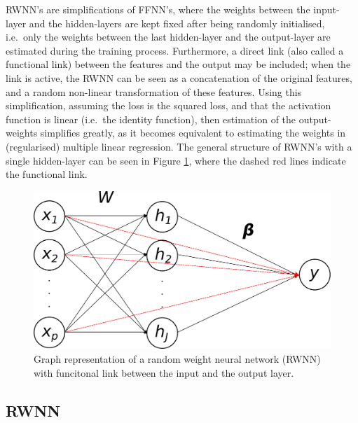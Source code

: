 \documentclass[
]{jss}
\begin{document}
RWNN's are simplifications of FFNN's, where the weights between the
input-layer and the hidden-layers are kept fixed after being randomly
initialised, i.e.~only the weights between the last hidden-layer and the
output-layer are estimated during the training process. Furthermore, a
direct link (also called a functional link) between the features and the
output may be included; when the link is active, the RWNN can be seen as
a concatenation of the original features, and a random non-linear
transformation of these features. Using this simplification, assuming
the loss is the squared loss, and that the activation function is linear
(i.e.~the identity function), then estimation of the output-weights
simplifies greatly, as it becomes equivalent to estimating the weights
in (regularised) multiple linear regression. The general structure of
RWNN's with a single hidden-layer can be seen in Figure \ref{fig:rwnn},
where the dashed red lines indicate the functional link.

\begin{CodeChunk}
\begin{figure}[ht!]

{\centering \includegraphics[width=0.6\linewidth]{./Figures/RWNN} 

}

\caption[Graph representation of a random weight neural network (RWNN) with funcitonal link between the input and the output layer]{Graph representation of a random weight neural network (RWNN) with funcitonal link between the input and the output layer.}\label{fig:rwnn}
\end{figure}
\end{CodeChunk}

\hypertarget{rwnn}{%
\subsection{RWNN}\label{rwnn}}
\end{document}
